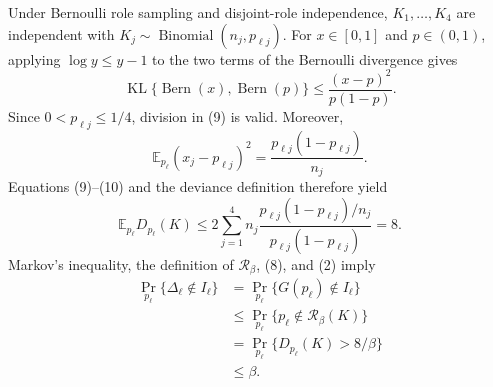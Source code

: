 Under Bernoulli role sampling and disjoint-role independence, \(K_1,\ldots,K_4\) are independent with \(K_j\sim\operatorname{Binomial}(n_j,p_{\ell j})\).  For \(x\in[0,1]\) and \(p\in(0,1)\), applying \(\log y\leq y-1\) to the two terms of the Bernoulli divergence gives
\[
\operatorname{KL}\{\operatorname{Bern}(x),\operatorname{Bern}(p)\}
\leq\frac{(x-p)^2}{p(1-p)}.
\tag{9}
\]
Since \(0<p_{\ell j}\leq1/4\), division in (9) is valid.  Moreover,
\[
\mathbb E_{p_\ell}(x_j-p_{\ell j})^2
=\frac{p_{\ell j}(1-p_{\ell j})}{n_j}.
\tag{10}
\]
Equations (9)--(10) and the deviance definition therefore yield
\[
\mathbb E_{p_\ell}D_{p_\ell}(K)
\leq2\sum_{j=1}^4n_j
\frac{p_{\ell j}(1-p_{\ell j})/n_j}
{p_{\ell j}(1-p_{\ell j})}
=8.
\tag{11}
\]
Markov's inequality, the definition of \(\mathcal R_\beta\), (8), and (2) imply
\[
\begin{aligned}
\Pr_{p_\ell}\{\Delta_\ell\notin I_\ell\}
&=\Pr_{p_\ell}\{G(p_\ell)\notin I_\ell\}\\
&\leq\Pr_{p_\ell}\{p_\ell\notin\mathcal R_\beta(K)\}\\
&=\Pr_{p_\ell}\{D_{p_\ell}(K)>8/\beta\}\\
&\leq\beta.
\end{aligned}
\tag{12}
\]

